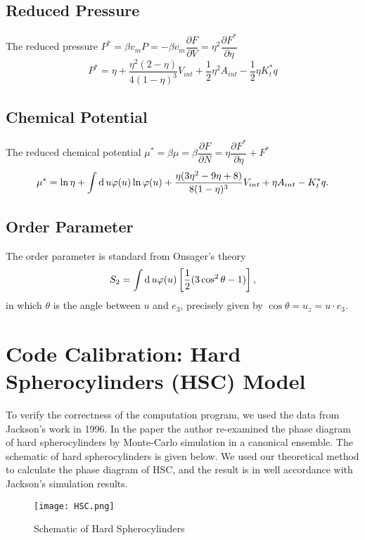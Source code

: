 \subsection{Reduced Pressure}
The reduced pressure $P^*=\beta v_m P=-\beta v_m \dfrac{\partial F}{\partial V}= \eta^2\dfrac{\partial F^*}{\partial\eta}$
\begin{equation}\label{Eqn:Press}
	P^* = \eta + \frac{\eta^2(2-\eta)}{4(1-\eta)^3}V_{int}+\frac{1}{2}\eta^2A_{int}-\frac{1}{2}\eta K_t^*q
\end{equation}

\subsection{Chemical Potential}
The reduced chemical potential $\mu^*=\beta\mu=\beta\dfrac{\partial F}{\partial N}=\eta\dfrac{\partial F^*}{\partial\eta}+F^*$
\begin{equation}\label{Eqn:ChemPot}
	\mu^*=\ln\eta+\int\operatorname{d}u\varphi(u)\ln \varphi(u)+\frac{\eta(3\eta^2-9\eta+8)}{8(1-\eta)^3}V_{int}+\eta A_{int}-K_t^*q.
\end{equation}

\subsection{Order Parameter}
The order parameter is standard from Onsager's theory
\begin{equation}
	S_2=\int \operatorname{d}u\varphi(u)\left[\frac{1}{2}(3\cos^2\theta -1)\right],
\end{equation}
in which $\theta$ is the angle between $u$ and $e_3$, precisely given by $\cos\theta = u_z = u\cdot e_3$.

\section{Code Calibration: Hard Spherocylinders (HSC) Model}
To verify the correctness of the computation program, we used the data from Jackson's work\cite{Jackson1996JCP} in 1996. In the paper the author re-examined the phase diagram of hard spherocylinders by Monte-Carlo simulation in a canonical ensemble. The schematic of hard spherocylinders is given below. We used our theoretical method to calculate the phase diagram of HSC, and the result is in well accordance with Jackson's simulation results.

\begin{figure}[H]
 	\centering
 	\texttt{[image: HSC.png]}
	\caption[Schematic of Hard Spherocylinders]{Schematic of Hard Spherocylinders\cite{Jackson1996JCP}}
	\label{fig:MDdiag}
\end{figure}

